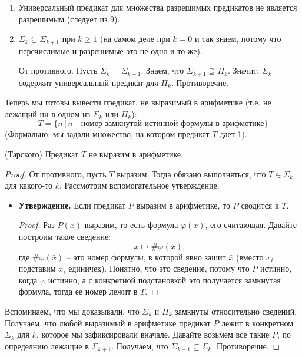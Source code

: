 \begin{enumerate}
    \item Универсальный предикат для множества разрешимых предикатов не является разрешимым (следует из 9).
    \item $\Sigma_k \subsetneq \Sigma_{k+1}$ при $k \geqslant 1$ (на самом деле при $k = 0$ и так знаем, потому что перечислимые и разрешимые это не одно и то же).
    
    От противного. Пусть $\Sigma_k = \Sigma_{k+1}$. Знаем, что $\Sigma_{k+1} \supseteq \Pi_k$. Значит, $\Sigma_k$ содержит универсальный предикат для $\Pi_k$. Противоречие.
\end{enumerate}

Теперь мы готовы вывести предикат, не выразимый в арифметике (т.е. не лежащий ни в одном из $\Sigma_k$ или $\Pi_k$): \[ T = \{ n \,|\, \text{$n$ - номер замкнутой истинной формулы в арифметике} \} \] 
(Формально, мы задали множество, на котором предикат $T$ дает 1).

\vspace*{5mm}

\begin{theorem} (Тарского)
    Предикат $T$ не выразим в арифметике.
\end{theorem}
\begin{proof}
    От противного, пусть $T$ выразим, Тогда обязано выполняться, что $T \in \Sigma_k$ для какого-то $k$. Рассмотрим вспомогательное утверждение.

    \begin{itemize}
        \item[] \textbf{Утверждение.} Если предикат $P$ выразим в арифметике, то $P$ сводится к $T$. 
        \begin{proof}
            Раз $P(x)$ выразим, то есть формула $\varphi(x)$, его считающая. Давайте 
            построим такое сведение: \[ \bar{x} \mapsto \#\varphi(\bar{x}), \] 
            где $\#\varphi(\bar{x})$ -- это номер формулы, в которой явно зашит $\bar{x}$ (вместо $x_i$ подставим $x_i$ единичек). Понятно, что это сведение, потому что $P$ истинно, когда $\varphi$ истинно, а с конкретной подстановкой это получается замкнутая формула, тогда ее номер лежит в $T$. 
        \end{proof}
    \end{itemize}

    Вспоминаем, что мы доказывали, что $\Sigma_k$ и $\Pi_k$ замкнуты относительно сведений. Получаем, что любой выразимый в арифметике предикат $P$ лежит в конкретном $\Sigma_k$ для $k$, которое мы зафиксировали вначале. Давайте возьмем все такие $P$, по определнию лежащие в $\Sigma_{k+1}$. Получаем, что $\Sigma_{k+1} \subseteq \Sigma_k$. Противоречие.
\end{proof}

